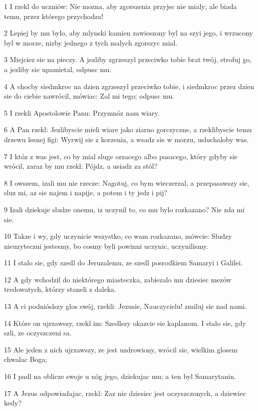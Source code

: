 \par 1 I rzekl do uczniów: Nie mozna, aby zgorszenia przyjsc nie mialy; ale biada temu, przez którego przychodza!
\par 2 Lepiej by mu bylo, aby mlynski kamien zawieszony byl na szyi jego, i wrzucony byl w morze, nizby jednego z tych malych zgorszyc mial.
\par 3 Miejciez sie na pieczy. A jezliby zgrzeszyl przeciwko tobie brat twój, strofuj go, a jezliby sie upamietal, odpusc mu.
\par 4 A chocby siedmkroc na dzien zgrzeszyl przeciwko tobie, i siedmkroc przez dzien sie do ciebie nawrócil, mówiac: Zal mi tego; odpusc mu.
\par 5 I rzekli Apostolowie Panu: Przymnóz nam wiary.
\par 6 A Pan rzekl: Jezlibyscie mieli wiare jako ziarno gorczyczne, a rzeklibyscie temu drzewu lesnej figi: Wyrwij sie z korzenia, a wsadz sie w morzu, usluchaloby was.
\par 7 I któz z was jest, co by mial sluge orzacego albo pasacego, który gdyby sie wrócil, zaraz by mu rzekl: Pójdz, a usiadz za stól?
\par 8 I owszem, izali mu nie rzecze: Nagotuj, co bym wieczerzal, a przepasawszy sie, sluz mi, az sie najem i napije, a potem i ty jedz i pij?
\par 9 Izali dziekuje sludze onemu, iz uczynil to, co mu bylo rozkazano? Nie zda mi sie.
\par 10 Takze i wy, gdy uczynicie wszystko, co wam rozkazano, mówcie: Sludzy nieuzyteczni jestesmy, bo cosmy byli powinni uczynic, uczynilismy.
\par 11 I stalo sie, gdy szedl do Jeruzalemu, ze szedl posrodkiem Samaryi i Galilei.
\par 12 A gdy wchodzil do niektórego miasteczka, zabiezalo mu dziesiec mezów tredowatych, którzy staneli z daleka.
\par 13 A ci podnióslszy glos swój, rzekli: Jezusie, Nauczycielu! zmiluj sie nad nami.
\par 14 Które on ujrzawszy, rzekl im: Szedlszy okazcie sie kaplanom. I stalo sie, gdy szli, ze oczyszczeni sa.
\par 15 Ale jeden z nich ujrzawszy, ze jest uzdrowiony, wrócil sie, wielkim glosem chwalac Boga;
\par 16 I padl na oblicze swoje u nóg jego, dziekujac mu; a ten byl Samarytanin.
\par 17 A Jezus odpowiadajac, rzekl: Zaz nie dziesiec jest oczyszczonych, a dziewiec kedy?
